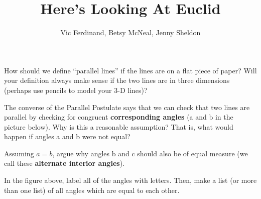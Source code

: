 \documentclass{ximera}
\title{Here's Looking At Euclid}
\author{Vic Ferdinand, Betsy McNeal, Jenny Sheldon}
\begin{document}
\begin{abstract}
\end{abstract}

\maketitle





\begin{question}
How should we define ``parallel lines'' if the lines are on a flat piece of paper?  Will your definition always make sense if the two lines are in three dimensions (perhaps use pencils to model your 3-D lines)?
\end{question}









\begin{problem} \label{Euclid1}
The converse of the Parallel Postulate says that we can check that two lines are parallel by checking for congruent {\bf corresponding angles} (a and b in the picture below).  Why is this a reasonable assumption? That is, what would happen if angles a and b were not equal?  

\begin{center}
\end{center}



\end{problem}







\begin{problem}
Assuming $a = b$, argue why angles b and c should also be of equal measure (we call these {\bf alternate interior angles}).
\end{problem}

\begin{problem}
In the figure above, label all of the angles with letters.  Then, make a list (or more than one list) of all angles which are equal to each other.
\end{problem}
\end{document}
